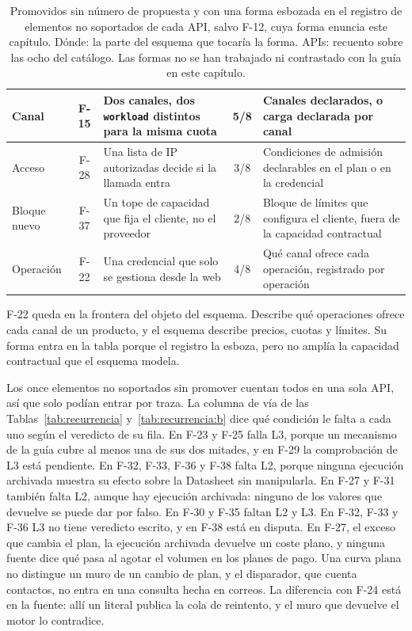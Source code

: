 \begin{table}[H]
\begin{tabular}{|l|c|p{}|c|p{}|}
\hline
Canal & F-15 & Dos canales, dos \texttt{workload} distintos para la misma cuota & 5/8 & Canales declarados, o carga declarada por canal \\
\hline
Acceso & F-28 & Una lista de IP autorizadas decide si la llamada entra & 3/8 & Condiciones de admisión declarables en el plan o en la credencial \\
\hline
Bloque nuevo & F-37 & Un tope de capacidad que fija el cliente, no el proveedor & 2/8 & Bloque de límites que configura el cliente, fuera de la capacidad contractual \\
\hline
Operación & F-22 & Una credencial que solo se gestiona desde la web & 4/8 & Qué canal ofrece cada operación, registrado por operación \\
\hline
\end{tabular}
\caption{Promovidos sin número de propuesta y con una forma esbozada en el registro de elementos no soportados de cada API, salvo F-12, cuya forma enuncia este capítulo. Dónde: la parte del esquema que tocaría la forma. APIs: recuento sobre las ocho del catálogo. Las formas no se han trabajado ni contrastado con la guía en este capítulo.}
\label{tab:sinforma}
\end{table}

F-22 queda en la frontera del objeto del esquema.
Describe qué operaciones ofrece cada canal de un producto, y el esquema describe precios, cuotas y límites.
Su forma entra en la tabla porque el registro la esboza, pero no amplía la capacidad contractual que el esquema modela.

Los once elementos no soportados sin promover cuentan todos en una sola API, así que solo podían entrar por traza.
La columna de vía de las Tablas~\ref{tab:recurrencia} y~\ref{tab:recurrencia:b} dice qué condición le falta a cada uno según el veredicto de su fila.
En F-23 y F-25 falla L3, porque un mecanismo de la guía cubre al menos una de sus dos mitades, y en F-29 la comprobación de L3 está pendiente.
En F-32, F-33, F-36 y F-38 falta L2, porque ninguna ejecución archivada muestra su efecto sobre la Datasheet sin manipularla.
En F-27 y F-31 también falta L2, aunque hay ejecución archivada: ninguno de los valores que devuelve se puede dar por falso.
En F-30 y F-35 faltan L2 y L3.
En F-32, F-33 y F-36 L3 no tiene veredicto escrito, y en F-38 está en disputa.
En F-27, el exceso que cambia el plan, la ejecución archivada devuelve un coste plano, y ninguna fuente dice qué pasa al agotar el volumen en los planes de pago.
Una curva plana no distingue un muro de un cambio de plan, y el disparador, que cuenta contactos, no entra en una consulta hecha en correos.
La diferencia con F-24 está en la fuente: allí un literal publica la cola de reintento, y el muro que devuelve el motor lo contradice.

